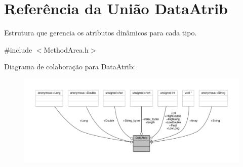 \hypertarget{unionDataAtrib}{}\section{Referência da União Data\+Atrib}
\label{unionDataAtrib}


Estrutura que gerencia os atributos dinâmicos para cada tipo.  




{\ttfamily \#include $<$Method\+Area.\+h$>$}



Diagrama de colaboração para Data\+Atrib\+:\nopagebreak
\begin{figure}[H]
\begin{center}
\leavevmode
\includegraphics[width=350pt]{unionDataAtrib__coll__graph}
\end{center}
\end{figure}
